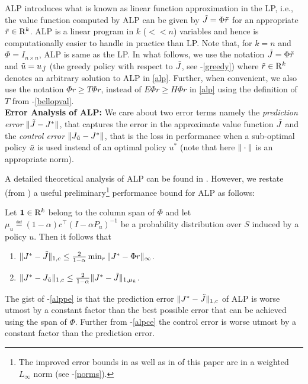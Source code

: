 ALP introduces what is known as linear function approximation in the LP, i.e., the value function computed by ALP can be given by $\tilde{J}=\Phi \tilde{r}$ for an appropriate $\tilde{r}\in \mathrm{R}^k$. ALP is a linear program in $k$ ($<<n$) variables and hence is computationally easier to handle in practice than LP. Note that, for $k=n$ and $\Phi=I_{n\times n}$, ALP is same as the LP. In what follows, we use the notation $\tilde{J}=\Phi \tilde{r}$ and $\tilde{u}=u_{\tilde{J}}$ (the greedy policy with respect to $\tilde{J}$, see -\eqref{greedy}) where $\tilde{r}\in\mathrm{R}^k$ denotes an arbitrary solution to ALP in \eqref{alp}. Further, when convenient, we also use the notation $\Phi r \geq T\Phi r$, instead of $E\Phi r\geq H \Phi r$ in \eqref{alp} using the definition of $T$ from -\eqref{bellopval}.\\
\textbf{Error Analysis of ALP:} %
We care about two error terms namely the \emph{prediction error} $\|\tilde{J}-J^*\|$, that captures the error in the approximate value function $\tilde{J}$ and the \emph{control error} $\|J_{\tilde{u}}-J^*\|$, that is the loss in performance when a sub-optimal policy $\tilde{u}$ is used instead of an optimal policy $u^*$ (note that here $\|\cdot\|$ is an appropriate norm).\par
A detailed theoretical analysis of ALP can be found in \cite{ALP}. However, we restate (from \cite{ALP}) a useful preliminary\footnote{The improved error bounds in \cite{ALP} as well as in  of this paper are in a weighted $L_\infty$ norm (see -\eqref{norms}).} performance bound for ALP as follows:
\begin{theorem}\label{alpvanilla}
Let $\mathbf{1}\in \mathrm{R}^k$ belong to the column span of $\Phi$ and let $\mu_u\eqdef (1-\alpha)c^\top(I-\alpha P_u)^{-1}$ be a probability distribution over $S$ induced by a policy $u$. Then it follows that
\begin{enumerate}
\item\label{alppe} $\|J^*-\tilde{J}\|_{1,c}\leq \frac{2}{1-\alpha}\min_{r}\|J^*-\Phi r\|_\infty$.
\item\label{alpce} $\|J^*-J_{\tilde{u}}\|_{1,c}\leq \frac{2}{1-\alpha}\|J^*-\tilde{J}\|_{1,\mu_{\tilde{u}}}$.
\end{enumerate}
\end{theorem}
The gist of -\eqref{alppe} is that the prediction error $\|J^*-\tilde{J}\|_{1,c}$ of ALP is worse utmost by a constant factor than the best possible error that can be achieved using the span of $\Phi$. Further from -\eqref{alpce} the control error is worse utmost by a constant factor than the prediction error.\\
